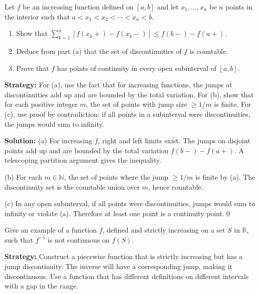 \begin{problembox}
Let $f$ be an increasing function defined on $[a, b]$ and let $x_1, \ldots, x_n$ be $n$ points in the interior such that $a < x_1 < x_2 < \cdots < x_n < b$.
\begin{enumerate}[label=(\alph*)]
\item Show that $\sum_{k=1}^n [f(x_k+) - f(x_k-)] \leq f(b-) - f(a+)$.
\item Deduce from part (a) that the set of discontinuities of $f$ is countable.
\item Prove that $f$ has points of continuity in every open subinterval of $[a, b]$.
\end{enumerate}
\end{problembox}

\noindent\textbf{Strategy:} For (a), use the fact that for increasing functions, the jumps at discontinuities add up and are bounded by the total variation. For (b), show that for each positive integer $m$, the set of points with jump size $\geq 1/m$ is finite. For (c), use proof by contradiction: if all points in a subinterval were discontinuities, the jumps would sum to infinity.

\bigskip\noindent\textbf{Solution:}
(a) For increasing $f$, right and left limits exist. The jumps on disjoint points add up and are bounded by the total variation $f(b-)-f(a+)$. A telescoping partition argument gives the inequality.

(b) For each $m\in\mathbb{N}$, the set of points where the jump $\ge 1/m$ is finite by (a). The discontinuity set is the countable union over $m$, hence countable.

(c) In any open subinterval, if all points were discontinuities, jumps would sum to infinity or violate (a). Therefore at least one point is a continuity point.\qed



\begin{problembox}
Give an example of a function $f$, defined and strictly increasing on a set $S$ in $\mathbb{R}$, such that $f^{-1}$ is not continuous on $f(S)$.
\end{problembox}

\noindent\textbf{Strategy:} Construct a piecewise function that is strictly increasing but has a jump discontinuity. The inverse will have a corresponding jump, making it discontinuous. Use a function that has different definitions on different intervals with a gap in the range.

